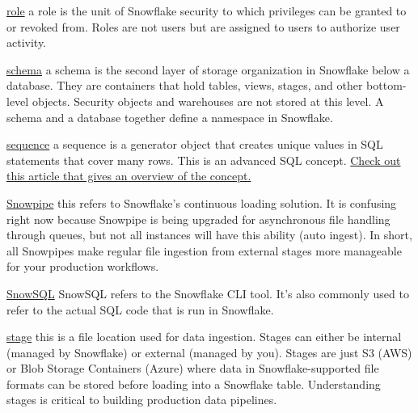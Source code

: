 \documentclass[9pt]{innovativeinnovation-cheatsheet}
\begin{document}
\begin{multicols}{3}
      \item \href{https://docs.snowflake.net/manuals/user-guide/security-access-control-overview.html#roles}{role}  a role is the unit of Snowflake security to which privileges can be granted to or revoked from. Roles are not users but are assigned to users to authorize user activity.
      
      \item \href{https://docs.snowflake.net/manuals/sql-reference/ddl-database.html#schema-management}{schema}  a schema is the second layer of storage organization in Snowflake below a database. They are containers that hold tables, views, stages, and other bottom-level objects. Security objects and warehouses are not stored at this level. A schema and a database together define a namespace in Snowflake.
      
      \item \href{https://docs.snowflake.net/manuals/user-guide/querying-sequences.html}{sequence}  a sequence is a generator object that creates unique values in SQL statements that cover many rows. This is an advanced SQL concept. \href{https://www.geeksforgeeks.org/sql-sequences/}{Check out this article that gives an overview of the concept.}
      
      \item \href{https://docs.snowflake.net/manuals/user-guide/data-load-snowpipe-intro.html}{Snowpipe}  this refers to Snowflake's continuous loading solution. It is confusing right now because Snowpipe is being upgraded for asynchronous file handling through queues, but not all instances will have this ability (auto ingest). In short, all Snowpipes make regular file ingestion from external stages more manageable for your production workflows.
      
      \item \href{https://docs.snowflake.net/manuals/user-guide/snowsql.html}{SnowSQL}  SnowSQL refers to the Snowflake CLI tool. It's also commonly used to refer to the actual SQL code that is run in Snowflake.
      
      \item \href{https://docs.snowflake.net/manuals/sql-reference/sql/create-stage.html}{stage}  this is a file location used for data ingestion. Stages can either be internal (managed by Snowflake) or external (managed by you). Stages are just S3 (AWS) or Blob Storage Containers (Azure) where data in Snowflake-supported file formats can be stored before loading into a Snowflake table. Understanding stages is critical to building production data pipelines.
      

\end{multicols}
\end{document}
